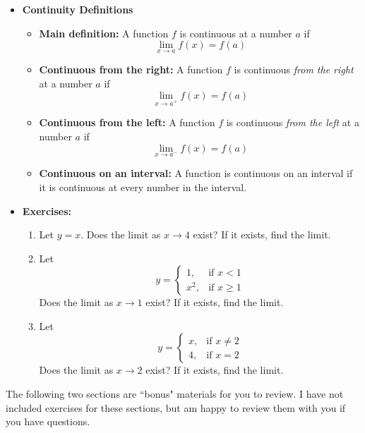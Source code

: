 \documentclass[11pt]{article}
\theoremstyle{definition}
\theoremstyle{remark}
\begin{document}
\begin{itemize}
\item\textbf{Continuity Definitions}
\begin{itemize}
\item\textbf{Main definition:}
A function $f$ is continuous at a number $a$ if
\begin{equation*}
\lim_{x \to a} f(x) = f(a)
\end{equation*}
\item\textbf{Continuous from the right:}
A function $f$ is continuous \textit{from the right} at a number $a$ if
\begin{equation*}
\lim_{x \to a^+} f(x) = f(a)
\end{equation*}
\item\textbf{Continuous from the left:}
A function $f$ is continuous \textit{from the left} at a number $a$ if
\begin{equation*}
\lim_{x \to a^-} f(x) = f(a)
\end{equation*}
\item\textbf{Continuous on an interval:}
A function is continuous on an interval if it is continuous at every number in the interval.
\end{itemize}

\item \textbf{Exercises:}
\begin{enumerate}
\item Let $y=x$. Does the limit as $x \to 4$ exist? If it exists, find the limit.
\item Let 
\begin{equation*}
 y=\begin{cases}
    1, & \text{if $x<1$}\\
    x^2, & \text{if $x \geq 1$}
  \end{cases}
\end{equation*} 
Does the limit as $x \to 1$ exist? If it exists, find the limit.
\item Let
\begin{equation*}
 y=\begin{cases}
    x, & \text{if $x\neq2$}\\
    4, & \text{if $x = 2$}
  \end{cases}
\end{equation*} 
Does the limit as $x \to 2$ exist? If it exists, find the limit.
\end{enumerate}
\end{itemize}

\newpage
\noindent The following two sections are ``bonus" materials for you to review. I have not included exercises for these sections, but am happy to review them with you if you have questions.
\end{document}
